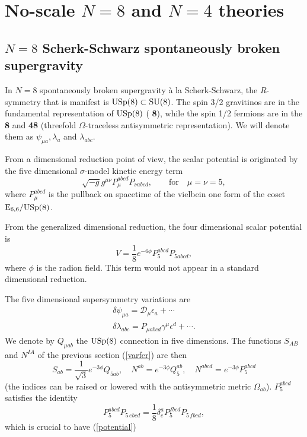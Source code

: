 \documentclass[a4paper,12pt]{article}
\begin{document}
 \section{No-scale $N=8$ and $N=4$ theories}

 \subsection{$N=8$ Scherk-Schwarz spontaneously broken supergravity}

 In $N=8$ spontaneously broken supergravity \`a la Scherk-Schwarz, the $R$-symmetry that is manifest
is
$\mathrm{USp}(8)\subset \mathrm{SU}(8)$. The spin 3/2 gravitinos are in the fundamental representation of $\mathrm{USp}(8)$
({\bf
8}), while the spin 1/2 fermions are in the {\bf 8} and {\bf 48} (threefold $\Omega$-traceless
antisymmetric representation). We will denote them as $\psi_{\mu a}, \lambda_a$ and $\lambda_{abc}$.

 From a dimensional reduction point of view, the scalar potential is originated by the five
dimensional
$\sigma$-model kinetic energy term
 $$\sqrt{-g}g^{\mu\nu}P_\mu^{abcd}P_{\nu abcd},\qquad \mathrm{for} \quad\mu=\nu=5, $$
 where $P_\mu^{abcd}$ is the pullback on spacetime of the  vielbein one form of the coset
$\mathrm{E}_{6,6}/\mathrm{USp}(8)$.

 From the generalized dimensional reduction, the four dimensional scalar potential is
\begin{equation}V=\frac{1}{8}e^{-6\phi}P_5^{abcd}P_{5 abcd},\label{potred}\end{equation}
where $\phi$ is the radion field. This term would not appear in a standard dimensional reduction.

The five dimensional supersymmetry variations are
\begin{eqnarray*} \delta\psi_{\mu a}=\mathcal{D}_\mu\epsilon_a+\cdots\\\delta\lambda_{abc}=P_{\mu
abcd}\gamma^\mu\epsilon^d+\cdots.\end{eqnarray*}
We denote by $Q_{\mu ab}$ the $\mathrm{USp}(8)$ connection in five dimensions.
The functions $S_{AB}$ and $N^{IA}$ of the previous section (\ref{varfer}) are then
$$S_{ab}=\frac{1}{\sqrt3}e^{-3\phi} Q_{5 ab}, \quad N^{ab}=e^{-3\phi}Q_5^{ab}, \quad
N^{abcd}=e^{-3\phi}
 P_5^{abcd}$$
(the indices can be raised or lowered with the antisymmetric metric $\Omega_{ab}$). $P_5^{abcd}$ 
satisfies the identity \cite{svn}
$$P_5^{abcd}P_{5\,ebcd}=\frac{1}{8}\delta^a_eP_5^{fbcd}P_{5\, fbcd},$$
which is crucial to have (\ref{potential})
\end{document}
